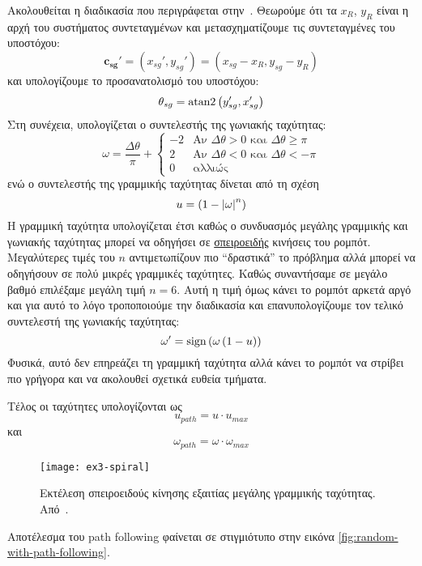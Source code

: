 Ακολουθείται η διαδικασία που περιγράφεται στην~\cite{etsardou-phd}.
Θεωρούμε ότι τα $x_R$, $y_R$ είναι η αρχή του συστήματος συντεταγμένων και μετασχηματίζουμε τις συντεταγμένες του υποστόχου:
\begin{equation}
    \mathbf{c_{sg}'} = \left(x_{sg}', y_{sg}'\right) = \left(x_{sg} - x_R, y_{sg} - y_R\right)
\end{equation}
και υπολογίζουμε το προσανατολισμό του υποστόχου:
\begin{equation}
    \theta_{sg} = \operatorname{atan2}{\left(y_{sg}', x_{sg}'\right)}
\end{equation}
Στη συνέχεια, υπολογίζεται ο συντελεστής της γωνιακής ταχύτητας:
\begin{equation}
    \omega = \frac{\Delta{\theta}}{\pi} +
    \begin{cases}
        -2 & \text{Αν $\Delta{\theta} > 0$ και $\Delta{\theta} \geq \pi$} \\
        2  & \text{Αν $\Delta{\theta} < 0$ και $\Delta{\theta} < -\pi$}   \\
        0  & \text{αλλιώς}
    \end{cases}
\end{equation}
ενώ ο συντελεστής της γραμμικής ταχύτητας δίνεται από τη σχέση
\begin{equation}
    u = \left(1-\left\lvert\omega\right\rvert^n\right)\label{eq:linear-coeff}
\end{equation}
Η γραμμική ταχύτητα υπολογίζεται έτσι καθώς ο συνδυασμός μεγάλης γραμμικής και γωνιακής ταχύτητας μπορεί να οδηγήσει σε \hyperref[fig:ex3-spiral]{σπειροειδής} κινήσεις του ρομπότ.
Μεγαλύτερες τιμές του $n$ αντιμετωπίζουν πιο ``δραστικά'' το πρόβλημα αλλά μπορεί να οδηγήσουν σε πολύ μικρές γραμμικές ταχύτητες.
Καθώς συναντήσαμε σε μεγάλο βαθμό επιλέξαμε μεγάλη τιμή $n = 6$.
Αυτή η τιμή όμως κάνει το ρομπότ αρκετά αργό και για αυτό το λόγο τροποποιούμε την διαδικασία και επανυπολογίζουμε τον τελικό συντελεστή της γωνιακής ταχύτητας:
\begin{equation}
    \omega' = \operatorname{sign}\left({\omega} \left(1 - u\right)\right)
\end{equation}
Φυσικά, αυτό δεν επηρεάζει τη γραμμική ταχύτητα αλλά κάνει το ρομπότ να στρίβει πιο γρήγορα και να ακολουθεί σχετικά ευθεία τμήματα.

Τέλος οι ταχύτητες υπολογίζονται ως
\begin{equation}
    u_{path} = u \cdot u_{max}
\end{equation}
και
\begin{equation}
    \omega_{path} = \omega \cdot \omega_{max}
\end{equation}

\begin{figure}[htb]
    \centering
    \texttt{[image: ex3-spiral]}
    \caption{Εκτέλεση σπειροειδούς κίνησης εξαιτίας μεγάλης γραμμικής ταχύτητας. Από~\protect\cite{etsardou-phd}.}\label{fig:ex3-spiral}
\end{figure}

Αποτέλεσμα του path following φαίνεται σε στιγμιότυπο στην εικόνα \ref{fig:random-with-path-following}.
